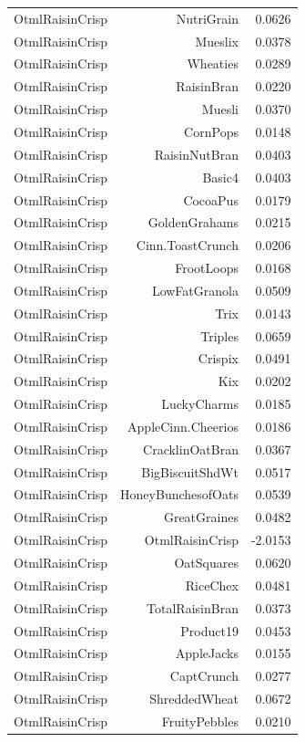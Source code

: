 \begin{longtable}{@{}lrr@{}}
OtmlRaisinCrisp & NutriGrain & 0.0626 \\
OtmlRaisinCrisp & Mueslix & 0.0378 \\
OtmlRaisinCrisp & Wheaties & 0.0289 \\
OtmlRaisinCrisp & RaisinBran & 0.0220 \\
OtmlRaisinCrisp & Muesli & 0.0370 \\
OtmlRaisinCrisp & CornPops & 0.0148 \\
OtmlRaisinCrisp & RaisinNutBran & 0.0403 \\
OtmlRaisinCrisp & Basic4 & 0.0403 \\
OtmlRaisinCrisp & CocoaPus & 0.0179 \\
OtmlRaisinCrisp & GoldenGrahams & 0.0215 \\
OtmlRaisinCrisp & Cinn.ToastCrunch & 0.0206 \\
OtmlRaisinCrisp & FrootLoops & 0.0168 \\
OtmlRaisinCrisp & LowFatGranola & 0.0509 \\
OtmlRaisinCrisp & Trix & 0.0143 \\
OtmlRaisinCrisp & Triples & 0.0659 \\
OtmlRaisinCrisp & Crispix & 0.0491 \\
OtmlRaisinCrisp & Kix & 0.0202 \\
OtmlRaisinCrisp & LuckyCharms & 0.0185 \\
OtmlRaisinCrisp & AppleCinn.Cheerios & 0.0186 \\
OtmlRaisinCrisp & CracklinOatBran & 0.0367 \\
OtmlRaisinCrisp & BigBiscuitShdWt & 0.0517 \\
OtmlRaisinCrisp & HoneyBunchesofOats & 0.0539 \\
OtmlRaisinCrisp & GreatGraines & 0.0482 \\
OtmlRaisinCrisp & OtmlRaisinCrisp & -2.0153 \\
OtmlRaisinCrisp & OatSquares & 0.0620 \\
OtmlRaisinCrisp & RiceChex & 0.0481 \\
OtmlRaisinCrisp & TotalRaisinBran & 0.0373 \\
OtmlRaisinCrisp & Product19 & 0.0453 \\
OtmlRaisinCrisp & AppleJacks & 0.0155 \\
OtmlRaisinCrisp & CaptCrunch & 0.0277 \\
OtmlRaisinCrisp & ShreddedWheat & 0.0672 \\
OtmlRaisinCrisp & FruityPebbles & 0.0210 \\

\end{longtable}
